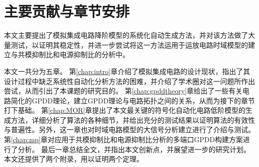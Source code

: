 \section{主要贡献与章节安排}
\label{sec:intro:org}

本文主要提出了模拟集成电路降阶模型的系统化自动生成方法，并对该方法做了大量测试，以证明其稳定性，并进一步尝试将这一方法运用于运放电路时域模型的建立与共模抑制比和电源抑制比的分析中。

本文一共分为五章。
第\ref{chap:intro}章介绍了模拟集成电路的设计现状，指出了其设计过程中缺乏系统性自动化分析方法的困难，并介绍了学术圈对这一问题所作出尝试，从而引出了本课题的研究目的。
第\ref{chap:gpddtheory}章给出了一些有关电路简化的GPDD理论，建立GPDD理论与电路拓扑之间的关系，从而为接下的章节打下基础。
第\ref{chap:MOR}章提出了本文最关键的符号化自动化电路低阶模型的生成方法，详细分析了算法的各种细节，并给出充分的测试结果以证明算法的有效性与普遍性。另外，这一章也对时域电路模型的大信号分析建立进行了介绍与测试。
第\ref{chap:mp}章对应用于共模抑制比和电源抑制比分析的多端口GPDD构建方案进行了分析。
最后一章总结全文，并指出本文创新点，并展望进一步的研究计划。
本文还提供了两个附录，用以证明两个定理。